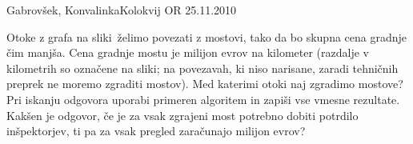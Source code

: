 \begin{naloga}{Gabrovšek, Konvalinka}{Kolokvij OR 25.11.2010}
\begin{vprasanje}
Otoke z grafa na sliki~\fig želimo povezati z mostovi,
tako da bo skupna cena grad\-nje čim manjša.
Cena gradnje mostu je milijon evrov na kilometer
(razdalje v kilometrih so označene na sliki;
na povezavah, ki niso narisane,
zaradi tehničnih preprek ne moremo zgraditi mostov).
Med katerimi otoki naj zgradimo mostove?
Pri iskanju odgovora uporabi primeren algoritem
in zapiši vse vmesne rezultate.
Kakšen je odgovor,
če je za vsak zgrajeni most potrebno dobiti potrdilo inšpektorjev,
ti pa za vsak pregled zaračunajo milijon evrov?

\begin{slika}
\pgfslika
{}
\end{slika}
\end{vprasanje}
\begin{odgovor}
\end{odgovor}
\end{naloga}
